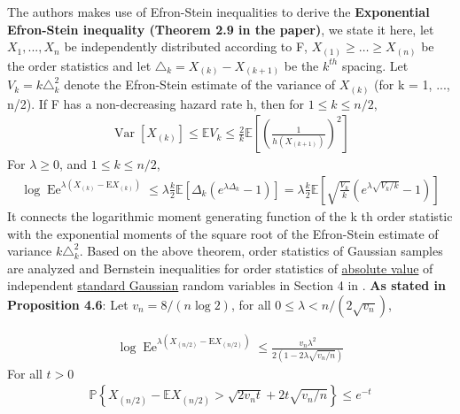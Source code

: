 \documentclass{article}
\begin{document}
The authors makes use of Efron-Stein inequalities to derive the \textbf{Exponential Efron-Stein inequality (Theorem 2.9 in the paper)}, we state it here, let $X_1,..., X_n$ be independently distributed according to F, $X_{(1)} \geq \ldots \geq X_{(n)}$ be the order statistics and let $\triangle_k = X_{(k)} - X_{(k+1)}$ be the $k^{th}$ spacing. Let $V_k = k \triangle_k^2$ denote the Efron-Stein estimate of the variance of $X_{(k)}$ (for k = 1, ..., n/2). If F has a non-decreasing hazard rate h, then for $1 \leq k \leq n/2$,
\begin{align}
    \operatorname{Var}\left[X_{(k)}\right] \leq \mathbb{E} V_{k} \leq \frac{2}{k} \mathbb{E}\left[\left(\frac{1}{h\left(X_{(k+1)}\right)}\right)^{2}\right]
\end{align}
For $\lambda \geq 0$, and $1\leq k \leq n/2$,
\begin{align}
    \label{Boucheron theorem 9-2}
    \log \operatorname{Ee}^{\lambda\left(X_{(k)}-\mathrm{E} X_{(k)}\right)} \leq \lambda \frac{k}{2} \mathbb{E}\left[\Delta_{k}\left(e^{\lambda \Delta_{k}}-1\right)\right]=\lambda \frac{k}{2} \mathbb{E}\left[\sqrt{\frac{V_{k}}{k}}\left(e^{\lambda \sqrt{V_{k} / k}}-1\right)\right]
\end{align}
It connects the logarithmic moment generating function of the k th order statistic with the exponential moments of the square root of the Efron-Stein estimate of variance $k \triangle_k^2$.
Based on the above theorem, order statistics of Gaussian samples are analyzed and Bernstein inequalities for order statistics of \underline{absolute value} of independent \underline{standard Gaussian} random variables in Section 4 in \cite{boucheron2012}. \textbf{As stated in Proposition 4.6}: Let $v_{n}=8 /(n \log 2)$, for all $0 \leq \lambda<n /\left(2 \sqrt{v_{n}}\right)$,

\begin{align}
    \label{Boucheron proposition 4.6-1}
    \log \operatorname{Ee}^{\lambda\left(X_{(n / 2)}-\mathrm{E} X_{(n / 2)}\right)} \leq \frac{v_{n} \lambda^{2}}{2\left(1-2 \lambda \sqrt{v_{n} / n}\right)}
\end{align}
For all $t > 0$
\begin{align}
    \mathbb{P}\left\{X_{(n / 2)}-\mathbb{E} X_{(n / 2)}>\sqrt{2 v_{n} t}+2 t \sqrt{v_{n} / n}\right\} \leq e^{-t}
\end{align}
\end{document}
